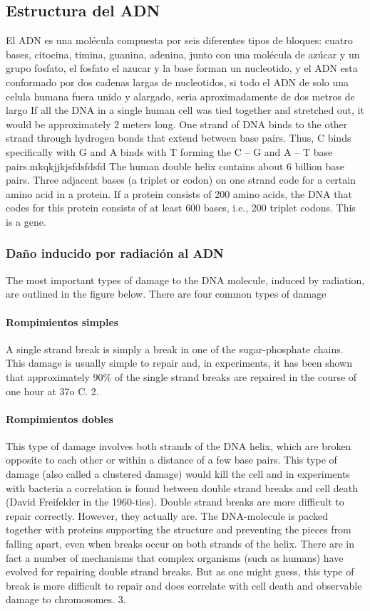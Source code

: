 \subsection{Estructura del ADN}
El ADN es una molécula compuesta por seis diferentes tipos de bloques: cuatro bases, citocina, timina, guanina, adenina, junto con una molécula de azúcar y un grupo fosfato, el fosfato el azucar y la base forman un nucleotido, y el ADN esta conformado por dos cadenas largas de nucleotidos, si todo el ADN de solo una celula humana fuera unido y alargado, seria aproximadamente de dos metros de largo
If all the DNA in a single human cell was tied together and stretched out, it would be approximately 2 meters long. One strand of DNA binds to the other strand through hydrogen bonds that extend between base pairs. Thus, C binds specifically with G and A binds with T forming the C – G and A – T base pairs.mkqkjjkjsfdsfdsfd
The human double helix contains about 6 billion base pairs. Three adjacent bases (a triplet or codon) on one strand code for a certain amino acid in a protein. If a protein consists of 200 amino acids, the DNA that codes for this protein consists of at least 600 bases, i.e., 200 triplet codons. This is a gene.

\subsubsection{Daño inducido por radiación al ADN}
The most important types of damage to the DNA molecule, induced by radiation, are outlined in the figure below. There are four common types of damage
\paragraph{Rompimientos simples}
A single strand break is simply a break in one of the sugar-phosphate chains. This damage is usually simple to repair and, in experiments, it has been shown that approximately 90\% of the single strand breaks are repaired in the course of one hour at 37o
C. 2.
\paragraph{Rompimientos dobles}
This type of damage involves both strands of the DNA helix, which are broken opposite to each other or within a distance of a few base pairs. This type of damage (also called a clustered damage) would kill the cell and in experiments with bacteria a correlation is found between double strand breaks and cell death (David Freifelder in the 1960-ties).
Double strand breaks are more difficult to repair correctly. However, they actually are. The DNA-molecule is packed together with proteins supporting the structure and preventing the pieces from falling apart, even when breaks occur on both strands of the helix. There are in fact a number of mechanisms that complex organisms (such as humans) have evolved for repairing double strand breaks. But as one might guess, this type of break is more difficult to repair and does correlate with cell death and observable damage to chromosomes.
3.
